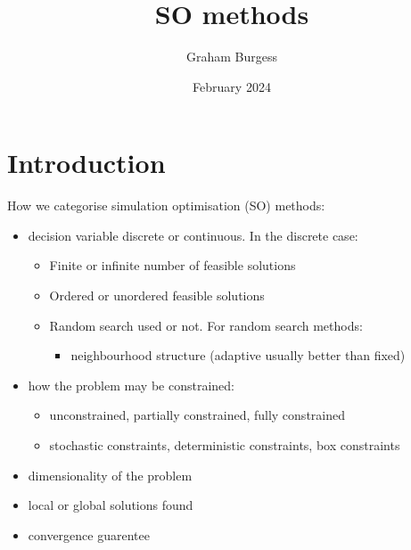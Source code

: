 \documentclass{article}
\title{SO methods}
\author{Graham Burgess}
\date{February 2024}
\begin{document}
\maketitle

\section{Introduction}

How we categorise simulation optimisation (SO) methods:

\begin{itemize}
  \item decision variable discrete or continuous. In the discrete case: 
  \begin{itemize}
    \item Finite or infinite number of feasible solutions
    \item Ordered or unordered feasible solutions
    \item Random search used or not. For random search methods:
    \begin{itemize}
      \item neighbourhood structure (adaptive usually better than fixed)
    \end{itemize}
  \end{itemize}
  \item how the problem may be constrained:
  \begin{itemize}
    \item unconstrained, partially constrained, fully constrained
    \item stochastic constraints, deterministic constraints, box constraints
  \end{itemize}
  \item dimensionality of the problem
  \item local or global solutions found
  \item convergence guarentee

\end{itemize}
\end{document}
